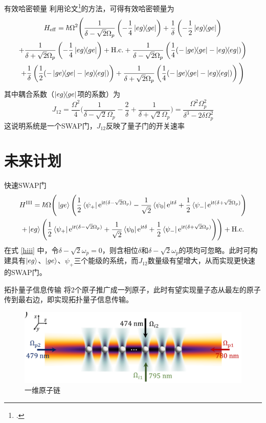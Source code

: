 \documentclass[10pt,aspectratio=43]{beamer}
\begin{document}
\begin{frame}{有效哈密顿量}
利用论文\footcite{James2007EffectiveHT}的方法，可得有效哈密顿量为
{\footnotesize\begin{multline}
H_{\mathrm{eff}}=\hbar\Omega^2\Bigg(\frac{1}{\delta-\sqrt{2}\Omega_p}\left(-\frac{1}{4}\ketbra{eg}{ge}\right)+\frac{1}{\delta}\left(-\frac{1}{2}\ketbra{eg}{ge}\right)\\
+\frac{1}{\delta+\sqrt{2}\Omega_p}\left(-\frac{1}{4}\ketbra{eg}{ge}\right)+\mathrm{H.c.}
+\frac{1}{\delta-\sqrt{2}\Omega_p}\left(\frac{1}{4}(-\ketbra{ge}{ge}-\ketbra{eg}{eg})\right)\\
+\frac{1}{\delta}\left(\frac{1}{2}(-\ketbra{ge}{ge}-\ketbra{eg}{eg})\right)
+\frac{1}{\delta+\sqrt{2}\Omega_p}\left(\frac{1}{4}(-\ketbra{ge}{ge}-\ketbra{eg}{eg})\right)\Bigg)
\end{multline}}
其中耦合系数（$ \ketbra{eg}{ge} $项的系数）为
{\small\begin{equation}
J_{12}=\frac{\Omega^2}{4}\Bigg(\frac{1}{\delta-\sqrt{2}\Omega_p}-\frac{2}{\delta}+\frac{1}{\delta+\sqrt{2}\Omega_p}\Bigg)=\frac{\Omega^2\Omega_p^2}{\delta^3-2\delta\Omega_p^2}
\end{equation}}
这说明系统是一个SWAP门，$ J_{12} $反映了量子门的开关速率
\end{frame}
\section{未来计划}
\begin{frame}{快速SWAP门}
\begin{multline*}
H^{\mathrm{III}}=\hbar\Omega\Bigg(\ket{ge}\Bigg(\frac{1}{2}\bra{\psi_+}\mathrm{e}^{\mathrm{i}t(\delta-\sqrt{2}\Omega_p)}-\frac{1}{\sqrt{2}}\bra{\psi_0}\mathrm{e}^{\mathrm{i}t \delta}+\frac{1}{2}\bra{\psi_-}\mathrm{e}^{\mathrm{i}t (\delta+\sqrt{2}\Omega_p)}\Bigg)\\
+\ket{eg}\Bigg(\frac{1}{2}\bra{\psi_+}\mathrm{e}^{\mathrm{i}t(\delta-\sqrt{2}\Omega_p)}+\frac{1}{\sqrt{2}}\bra{\psi_0}\mathrm{e}^{\mathrm{i}t \delta}+\frac{1}{2}\bra{\psi_-}\mathrm{e}^{\mathrm{i}t (\delta+\sqrt{2}\Omega_p)}\Bigg)\Bigg)+\mathrm{H.c.}
\end{multline*}
在式 \eqref{hiii} 中，令$ \delta-\sqrt{2}\omega_p=0 $，则含相位$ \delta $和$ \delta-\sqrt{2}\omega_p $的项均可忽略。此时可构建具有$ \ket{eg} $、$ \ket{ge} $、$ \psi_+ $三个能级的系统，而$ J_{12} $数量级有望增大，从而实现更快速的SWAP门。
\end{frame}
\begin{frame}{拓扑量子信息传输}
将2个原子推广成一列原子，此时有望实现量子态从最左的原子传到最右边，即实现拓扑量子信息传输。
\begin{figure}
\centering
\includegraphics[width=0.7\linewidth]{pra-energy-level-n}
\caption{一维原子链}
\label{fig:pra-energy-level-n}
\end{figure}

\end{frame}
\end{document}
